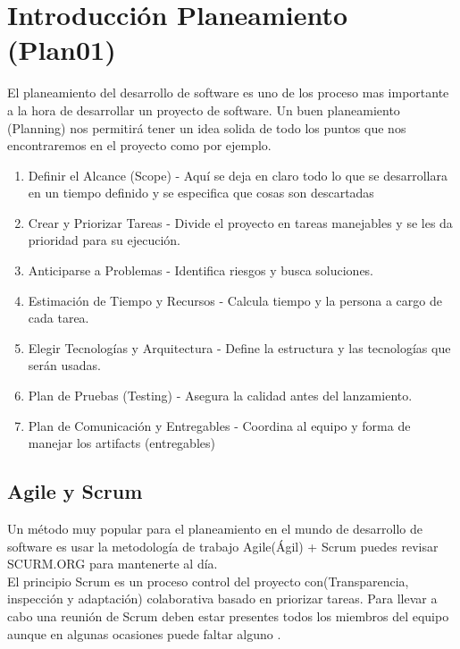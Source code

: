 \chapter{Introducción Planeamiento (Plan01)}
El planeamiento del desarrollo de software es uno de los proceso mas importante a la hora de desarrollar un proyecto de software.
Un buen planeamiento (Planning) nos permitirá tener un idea solida de todo los puntos que nos encontraremos en el proyecto como por ejemplo.
\begin{enumerate}
  \item Definir el Alcance (Scope) - Aquí se deja en claro todo lo que se desarrollara en un tiempo definido y se especifica que cosas son descartadas 
  \item Crear y Priorizar Tareas - Divide el proyecto en tareas manejables y se les da prioridad para su ejecución.
  \item Anticiparse a Problemas - Identifica riesgos y busca soluciones.
  \item Estimación de Tiempo y Recursos - Calcula tiempo y la persona a cargo de cada tarea.
  \item Elegir Tecnologías y Arquitectura - Define la estructura y las tecnologías que serán usadas.
  \item Plan de Pruebas (Testing) - Asegura la calidad antes del lanzamiento.
  \item Plan de Comunicación y Entregables - Coordina al equipo y forma de manejar los artifacts (entregables)
\end{enumerate}
\section{Agile y Scrum}
Un método muy popular para el planeamiento en el mundo de desarrollo de software es usar la metodología de trabajo Agile(Ágil) + Scrum puedes revisar SCURM.ORG para mantenerte al día.
\\
El principio Scrum es un proceso control del proyecto con(Transparencia, inspección y adaptación)  colaborativa basado en priorizar tareas.
Para llevar a cabo una reunión de Scrum deben estar presentes todos los miembros del equipo aunque en algunas ocasiones puede faltar alguno \cite{104049401}.

